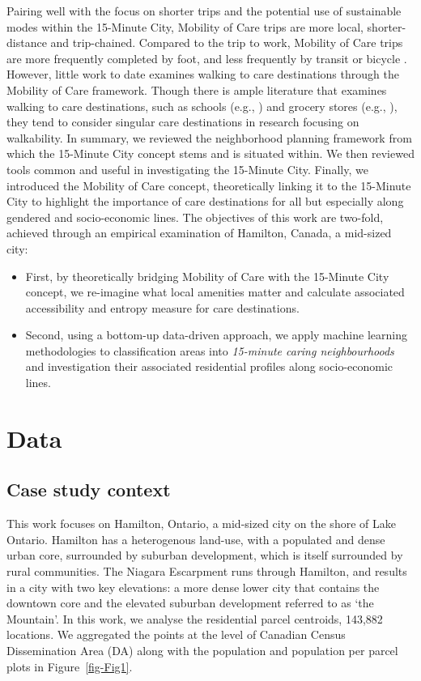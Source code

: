 \documentclass[
  authoryear,
  preprint,
  3p]{elsarticle}
\providecommand{\tightlist}{%
  \setlength{\itemsep}{0pt}\setlength{\parskip}{0pt}}\usepackage{longtable,booktabs,array}
\def\tightlist{}
\begin{document}
Pairing well with the focus on shorter trips and the potential use of
sustainable modes within the 15-Minute City, Mobility of Care trips are
more local, shorter-distance and trip-chained. Compared to the trip to
work, Mobility of Care trips are more frequently completed by foot, and
less frequently by transit or bicycle
\citep{ravensbergen2023exploratory}. However, little work to date
examines walking to care destinations through the Mobility of Care
framework. Though there is ample literature that examines walking to
care destinations, such as schools (e.g., \citep{RN7, RN8, RN9}) and
grocery stores (e.g., \citep{RN10, RN11}), they tend to consider
singular care destinations in research focusing on walkability. In
summary, we reviewed the neighborhood planning framework from which the
15-Minute City concept stems and is situated within. We then reviewed
tools common and useful in investigating the 15-Minute City. Finally, we
introduced the Mobility of Care concept, theoretically linking it to the
15-Minute City to highlight the importance of care destinations for all
but especially along gendered and socio-economic lines. The objectives
of this work are two-fold, achieved through an empirical examination of
Hamilton, Canada, a mid-sized city:

\begin{itemize}
\tightlist
\item
  First, by theoretically bridging Mobility of Care with the 15-Minute
  City concept, we re-imagine what local amenities matter and calculate
  associated accessibility and entropy measure for care destinations.
\item
  Second, using a bottom-up data-driven approach, we apply machine
  learning methodologies to classification areas into \emph{15-minute
  caring neighbourhoods} and investigation their associated residential
  profiles along socio-economic lines.
\end{itemize}

\section{Data}\label{data}

\subsection{Case study context}\label{case-study-context}

This work focuses on Hamilton, Ontario, a mid-sized city on the shore of
Lake Ontario. Hamilton has a heterogenous land-use, with a populated and
dense urban core, surrounded by suburban development, which is itself
surrounded by rural communities. The Niagara Escarpment runs through
Hamilton, and results in a city with two key elevations: a more dense
lower city that contains the downtown core and the elevated suburban
development referred to as `the Mountain'. In this work, we analyse the
residential parcel centroids, 143,882 locations. We aggregated the
points at the level of Canadian Census Dissemination Area (DA) along
with the population and population per parcel plots in
Figure~\ref{fig-Fig1}.
\end{document}
